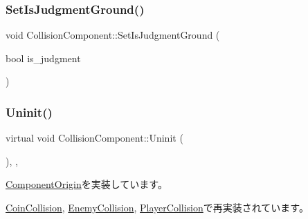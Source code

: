 \mbox{\label{class_collision_component_a84cf5e2c0e4804307c5cf1b78413deef}} 
\subsubsection{\texorpdfstring{Set\+Is\+Judgment\+Ground()}{SetIsJudgmentGround()}}
{\footnotesize\ttfamily void Collision\+Component\+::\+Set\+Is\+Judgment\+Ground (\begin{DoxyParamCaption}\item[{bool}]{is\+\_\+judgment }\end{DoxyParamCaption})\hspace{0.3cm}{\ttfamily [inline]}}

\mbox{\label{class_collision_component_aa75440061f7a60e8c4ee1dae18682cc0}} 
\subsubsection{\texorpdfstring{Uninit()}{Uninit()}}
{\footnotesize\ttfamily virtual void Collision\+Component\+::\+Uninit (\begin{DoxyParamCaption}{ }\end{DoxyParamCaption})\hspace{0.3cm}{\ttfamily [inline]}, {\ttfamily [override]}, {\ttfamily [virtual]}}



\mbox{\hyperlink{class_component_origin_a9f89a93f9c1954bd53f9750e35e6089d}{Component\+Origin}}を実装しています。



\mbox{\hyperlink{class_coin_collision_aa852afdcdbedcf82809df9c7fd99be9e}{Coin\+Collision}}, \mbox{\hyperlink{class_enemy_collision_a2a194c606fd162db803c70c6fed9b9e4}{Enemy\+Collision}}, \mbox{\hyperlink{class_player_collision_aa1ab60a62fa2ae3231a1ea0bc8faf801}{Player\+Collision}}で再実装されています。

\mbox{\label{class_collision_component_a3fa60fd8b4e8690f783c0f578949664e}} 
